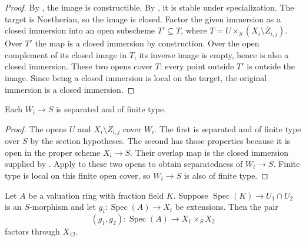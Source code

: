 \begin{proof}
  \leanok
  By , the image is
  constructible.  By
  , it is stable
  under specialization.  The target is Noetherian, so the image is closed.
  Factor the given immersion as a closed immersion into an open subscheme
  $T'\subseteq T$, where
  $T=U\times_S(X_i\setminus\overline Z_{i,j})$.  Over $T'$ the map is a
  closed immersion by construction.  Over the open complement of its closed
  image in $T$, its inverse image is empty, hence is also a closed immersion.
  These two opens cover $T$: every point outside $T'$ is outside the image.
  Since being a closed immersion is local on the target, the original
  immersion is a closed immersion.
\end{proof}

\begin{lemma}
  \label{lemma:nagata-intermediate-separated}
  \leanok

  Each $W_i\to S$ is separated and of finite type.
\end{lemma}

\begin{proof}
  \leanok
  The opens $U$ and $X_i\setminus\overline Z_{i,j}$ cover $W_i$.  The first
  is separated and of finite type over $S$ by the section hypotheses.  The
  second has those properties because it is open in the proper scheme
  $X_i\to S$.  Their overlap map is the closed immersion supplied by
  .  Apply
   to these two opens to obtain
  separatedness of $W_i\to S$.  Finite type is local on this finite open
  cover, so $W_i\to S$ is also of finite type.
\end{proof}

\begin{lemma}
  \label{lemma:nagata-valuation-pair-factors-comparison}
  \leanok

  Let $A$ be a valuation ring with fraction field $K$.  Suppose
  $\operatorname{Spec}(K)\to U_1\cap U_2$ is an $S$-morphism and let
  $g_i\colon\operatorname{Spec}(A)\to X_i$ be extensions.  Then the pair
  \[
    (g_1,g_2)\colon\operatorname{Spec}(A)\to X_1\times_SX_2
  \]
  factors through $X_{12}$.
\end{lemma}

